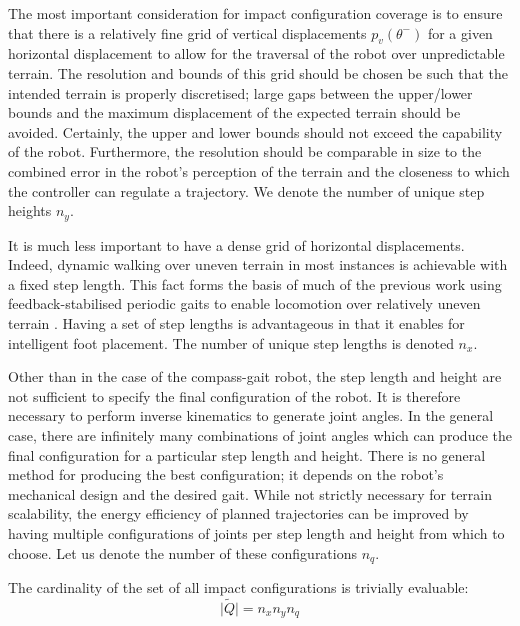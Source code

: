 The most important consideration for impact configuration coverage is to ensure that there is a relatively fine grid of vertical displacements $p_v(\theta^-)$ for a given horizontal displacement to allow for the traversal of the robot over unpredictable terrain. The resolution and bounds of this grid should be chosen be such that the intended terrain is properly discretised; large gaps between the upper/lower bounds and the maximum displacement of the expected terrain should be avoided. Certainly, the upper and lower bounds should not exceed the capability of the robot. Furthermore, the resolution should be comparable in size to the combined error in the robot's perception of the terrain and the closeness to which the controller can regulate a trajectory. We denote the number of unique step heights $n_y$.

It is much less important to have a dense grid of horizontal displacements. Indeed, dynamic walking over uneven terrain in most instances is achievable with a fixed step length. This fact forms the basis of much of the previous work using feedback-stabilised periodic gaits to enable locomotion over relatively uneven terrain \cite{raibert2008bigdog}. Having a set of step lengths is advantageous in that it enables for intelligent foot placement. The number of unique step lengths is denoted $n_x$.

Other than in the case of the compass-gait robot, the step length and height are not sufficient to specify the final configuration of the robot. It is therefore necessary to perform inverse kinematics to generate joint angles. In the general case, there are infinitely many combinations of joint angles which can produce the final configuration for a particular step length and height. There is no general method for producing the best configuration; it depends on the robot's mechanical design and the desired gait. While not strictly necessary for terrain scalability, the energy efficiency of planned trajectories can be improved by having multiple configurations of joints per step length and height from which to choose. Let us denote the number of these configurations $n_q$.

The cardinality of the set of all impact configurations is trivially evaluable:
\begin{equation} \label{eqn:numimpactconfs}
\lvert\tilde{Q}\rvert = n_xn_yn_q
\end{equation}

